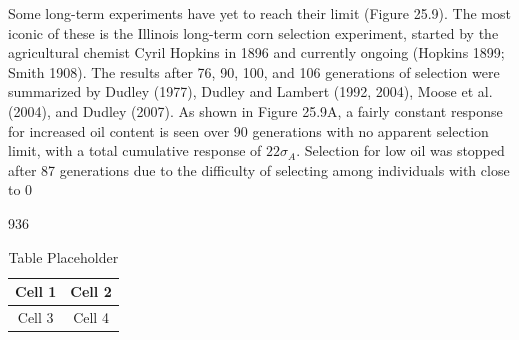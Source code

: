 \documentclass{article}
\begin{document}
Some long-term experiments have yet to reach their limit (Figure 25.9). The most iconic of these is the Illinois long-term corn selection experiment, started by the agricultural chemist Cyril Hopkins in 1896 and currently ongoing (Hopkins 1899; Smith 1908). The results after 76, 90, 100, and 106 generations of selection were summarized by Dudley (1977), Dudley and Lambert (1992, 2004), Moose et al. (2004), and Dudley (2007). As shown in Figure 25.9A, a fairly constant response for increased oil content is seen over 90 generations with no apparent selection limit, with a total cumulative response of  $ 22\sigma_{A} $. Selection for low oil was stopped after 87 generations due to the difficulty of selecting among individuals with close to 0%

936

\begin{table}[h]
\centering
\begin{tabular}{|c|c|}
\hline
Cell 1 & Cell 2 \\
\hline
Cell 3 & Cell 4 \\
\hline
\end{tabular}
\caption{Table Placeholder}
\end{table}
\end{document}
